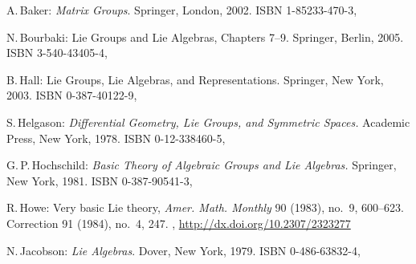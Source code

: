\begin{references}{9}

A.\,Baker:
\emph{Matrix Groups}.
Springer, London, 2002.
ISBN 1-85233-470-3,


 
N.\,Bourbaki:
Lie Groups and Lie Algebras, Chapters 7--9.
Springer, Berlin, 2005. 
ISBN 3-540-43405-4,



B.\,Hall:
Lie Groups, Lie Algebras, and Representations.
Springer, New York, 2003. 
ISBN 0-387-40122-9,

S.\,Helgason:
\emph{Differential Geometry, Lie Groups, and Symmetric Spaces.}
Academic Press, New York, 1978.
ISBN 0-12-338460-5,


 G.\,P.\,Hochschild:
 \emph{Basic Theory of Algebraic Groups and Lie Algebras.}
 Springer, New York, 1981.
 ISBN 0-387-90541-3,
 

R.\,Howe:
Very basic Lie theory,
\emph{Amer. Math. Monthly} 90 (1983), no.~9, 600--623. 
Correction 91 (1984), no.~4, 247.
,
\url{http://dx.doi.org/10.2307/2323277}

 
N.\,Jacobson:
\emph{Lie Algebras}.
Dover, New York, 1979.
ISBN 0-486-63832-4,


\end{references}
